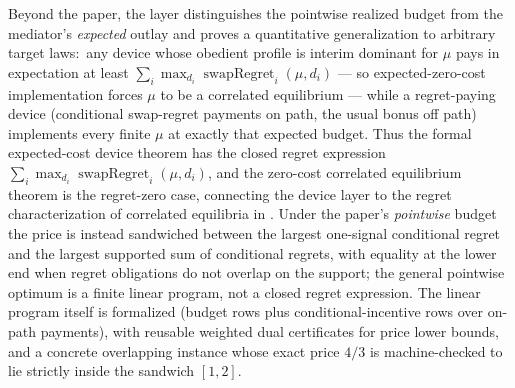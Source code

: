 Beyond the paper, the layer distinguishes the pointwise realized
budget from the mediator's \emph{expected} outlay and proves a
quantitative generalization to arbitrary target laws:\ any device
whose obedient profile is interim dominant for $\mu$ pays in
expectation at least $\sum_i \max_{d_i}
\operatorname{swapRegret}_i(\mu,d_i)$ — so expected-zero-cost
implementation forces $\mu$ to be a correlated equilibrium — while a
regret-paying device (conditional swap-regret payments on path, the
usual bonus off path) implements every finite $\mu$ at exactly that
expected budget.  Thus the formal expected-cost device theorem has the
closed regret expression \(\sum_i \max_{d_i}
\operatorname{swapRegret}_i(\mu,d_i)\), and the zero-cost correlated
equilibrium theorem is the regret-zero case, connecting the device
layer to the regret characterization of correlated equilibria in
.  Under the paper's \emph{pointwise}
budget the price is instead sandwiched between the largest one-signal
conditional regret and the largest supported sum of conditional
regrets, with equality at the lower end when regret obligations do
not overlap on the support; the general pointwise optimum is a finite
linear program, not a closed regret expression.  The linear program
itself is formalized (budget rows plus conditional-incentive rows over
on-path payments), with reusable weighted dual certificates for price
lower bounds, and a concrete overlapping instance whose exact price
$4/3$ is machine-checked to lie strictly inside the sandwich $[1,2]$.


